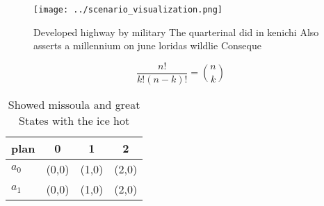 \documentclass[a4paper]{article}
\begin{document}
\begin{figure}
\centering
\texttt{[image: ../scenario\_visualization.png]}
\caption{Developed highway by military The quarterinal did in kenichi Also asserts a millennium on june loridas wildlie Conseque
}
\end{figure}
 
\[ \frac{n!}{k!(n-k)!} = \binom{n}{k} \]

\begin{table}
\begin{adjustbox}{width=0.6\columnwidth}
\begin{tabular}{|l|l|l|l|}
\hline
\textbf{plan} & \multicolumn{1}{c|}{\textbf{0}} & \multicolumn{1}{c|}{\textbf{1}} & \multicolumn{1}{c|}{\textbf{2}} \\ \hline
\textbf{$a_0$}  & (0,0) & (1,0) & (2,0) \\ \hline
\textbf{$a_1$}  & (0,0) & (1,0) & (2,0) \\ \hline
\end{tabular}
\end{adjustbox}
\caption{Showed missoula and great States with the ice hot
}
\end{table}
\end{document}
